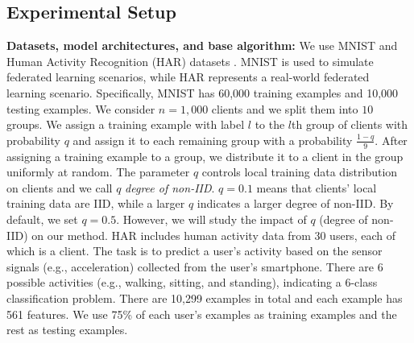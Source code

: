 \documentclass[letterpaper]{article} %
\begin{document}
\begin{table}[!tb]
\centering
{}
\caption{Federated learning settings and hyperparameters.}
\label{tab:hyperparameters}
\end{table}

\subsection{Experimental Setup}

\noindent
{\bf Datasets, model architectures, and base algorithm:} We use MNIST \cite{lecun2010mnist} and Human Activity Recognition (HAR) datasets \cite{anguita2013public}.  MNIST is used to simulate federated learning scenarios, while  HAR represents a real-world federated learning scenario. Specifically, MNIST has 60,000 training examples and 10,000 testing examples. We consider $n=1,000$ clients and we split them into $10$ groups. We assign a training example with label $l$ to the $l$th group of clients with probability $q$ and assign it to each remaining group with a probability $\frac{1-q}{9}$. After assigning a training example to a group, we distribute it to a client in the group uniformly at random. 
The parameter $q$ controls local training data distribution on clients and we call $q$ \emph{degree of non-IID}.  $q=0.1$ means that clients' local training data are IID, while a larger $q$ indicates a larger {degree of non-IID}. By default, we set $q=0.5$. However, we will study the impact of $q$ (degree of non-IID) on our method. HAR includes human activity data from 30 users, each of which is a client. The task is to predict a user's activity based on the sensor signals (e.g., acceleration) collected from the user's smartphone.  There are 6 possible activities (e.g., walking, sitting, and standing), indicating  a 6-class classification problem.  There are 10,299 examples in total and each example has 561 features. We use 75\% of each user's examples as training examples and the rest as testing examples.  
\end{document}
